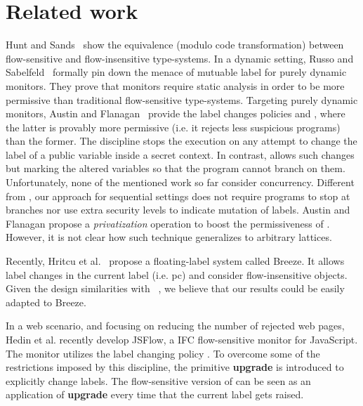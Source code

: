 \section{Related work}

Hunt and Sands~\citep{Hunt:2006} show the equivalence (modulo code
transformation) between flow-sensitive and flow-insensitive type-systems. In a
dynamic setting, Russo and Sabelfeld~\citep{Russo:2010} formally pin down the
menace of mutuable label for purely dynamic monitors. They prove that monitors
require static analysis in order to be more permissive than traditional
flow-sensitive type-systems. Targeting purely dynamic monitors, Austin and
Flanagan~\citep{Austin:Flanagan:PLAS10} provide the label changes policies
\emph{\nsu} and \emph{\pu}, where the latter is provably more permissive
(i.e. it rejects less suspicious programs) than the former. The discipline
{\nsu} stops the execution on any attempt to change the label of a public
variable inside a secret context. In contrast, {\pu} allows such changes but
marking the altered variables so that the program cannot branch on
them. Unfortunately, none of the mentioned work so far consider
concurrency. Different from {\pu}, our approach for sequential settings does not
require programs to stop at branches nor use extra security levels to indicate
mutation of labels. Austin and Flanagan propose a \emph{privatization} operation
to boost the permissiveness of {\pu}.  However, it is not clear how such
technique generalizes to arbitrary lattices.  

Recently, Hritcu et al.~\citep{10.1109/SP.2013.10} propose a floating-label
system called Breeze. It allows label changes in the current label (i.e. pc) and
consider flow-insensitive objects. Given the design similarities with
\LIO~\citep{stefan:lio}, we believe that our results could be easily adapted to
Breeze.

In a web scenario, and focusing on reducing the number of rejected web pages,
Hedin et al. \citep{Hedin13} recently develop JSFlow, a IFC flow-sensitive
monitor for JavaScript. The monitor utilizes the label changing policy
{\nsu}. To overcome some of the restrictions imposed by this discipline, the 
primitive \textbf{upgrade} is introduced to explicitly change labels. The
flow-sensitive version of {\forkLIO} can be seen as an application of
\textbf{upgrade} every time that the current label gets raised.  





